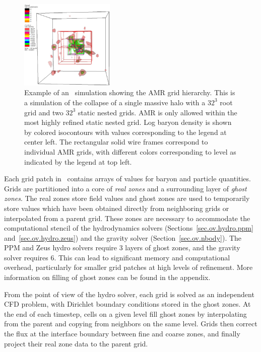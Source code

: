 \begin{figure}
\begin{center}
\includegraphics[width=0.4\textwidth]{figures/amr-hier-dens.eps}
\caption{Example of an \enzo\ simulation showing the AMR grid hierarchy.  
This is a simulation of the collapse of a single massive halo with a 
$32^3$ root grid and two $32^3$ static nested grids.  AMR is only allowed
within the most highly refined static nested grid.  Log baryon density is shown
by colored isocontours with values corresponding to the legend at center left.  
The rectangular solid wire frames correspond to individual 
AMR grids, with different colors corresponding to level as indicated by the
legend at top left.}
\label{fig.2.amrhierdens}
\end{center}
\end{figure}

Each grid patch in \enzo\ contains arrays of values for baryon and 
particle quantities.   Grids are 
partitioned into a core of \emph{real zones} and a surrounding layer 
of \emph{ghost zones}.  The real zones store field values and ghost 
zones are used to temporarily store values which have been obtained 
directly from neighboring grids or interpolated from a parent grid.  
These zones are necessary to accommodate the computational stencil of 
the hydrodynamics solvers (Sections~\ref{sec.ov.hydro.ppm} and~\ref{sec.ov.hydro.zeus}) 
and the gravity solver (Section~\ref{sec.ov.nbody}).  
The PPM and Zeus hydro solvers require 3 layers of ghost zones,  and the gravity
solver requires 6.  This can lead to significant memory 
and computational overhead, particularly for smaller grid patches
at high levels of refinement.  More information on filling of ghost
zones can be found in the appendix.

From the point of view of the hydro solver, each grid is solved as an
independent CFD problem, with Dirichlet boundary conditions stored in
the ghost zones.  At the end of each timestep, cells on a given level
fill ghost zones by interpolating from the parent and copying from
neighbors on the same level.  Grids then correct the flux at the interface boundary between
fine and coarse zones, and finally project their real zone data to the
parent grid. 


